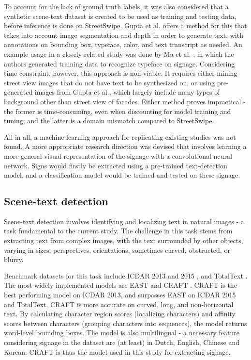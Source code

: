To account for the lack of ground truth labels, it was also considered that a synthetic scene-text dataset is created to be used as training and testing data, before inference is done on StreetSwipe. Gupta et al. \cite{gupta_synt_2016} offers a method for this that takes into account image segmentation and depth in order to generate text, with annotations on bounding box, typeface, color, and text transcript as needed. An example usage in a closely related study was done by Ma et al. \cite{ma_typef_2019}, in which the authors generated training data to recognize typeface on signage. Considering time constraint, however, this approach is non-viable. It requires either mining street view images that do not have text to be synthesized on, or using pre-generated images from Gupta et al., which largely include many types of background other than street view of facades. Either method proves impractical - the former is time-consuming, even when discounting for model training and tuning; and the latter is a domain mismatch compared to StreetSwipe.

All in all, a machine learning approach for replicating existing studies was not found. A more appropriate research direction was devised that involves learning a more general visual representation of the signage with a convolutional neural network. Signs would firstly be extracted using a pre-trained text-detection model, and a classification model would be trained and tested on these signage.

\subsection{Scene-text detection}
Scene-text detection involves identifying and localizing text in natural images - a task fundamental to the current study. The challenge in this task stems from extracting text from complex images, with the text surrounded by other objects, varying in sizes, perspectives, orientations, sometimes curved, obstructed, or blurry.

Benchmark datasets for this task include ICDAR 2013 \cite{icdar13} and 2015 \cite{icdar15}, and TotalText \cite{totaltext}. The most widely implemented models are EAST \cite{zhou_east_2017} and CRAFT \cite{baek_character_2019}. CRAFT is the best performing model on ICDAR 2013, and surpasses EAST on ICDAR 2015 and TotalText. CRAFT is more accurate on curved, long, and non-horizontal text. By calculating character region scores (localizing characters) and affinity scores between characters (grouping characters into sequences), the model returns word-level bounding boxes. The model is also multilingual - a necessary feature considering signage in the dataset are (at least) in Dutch, English, Chinese and Korean. CRAFT is thus the model used in this study for extracting signage.

